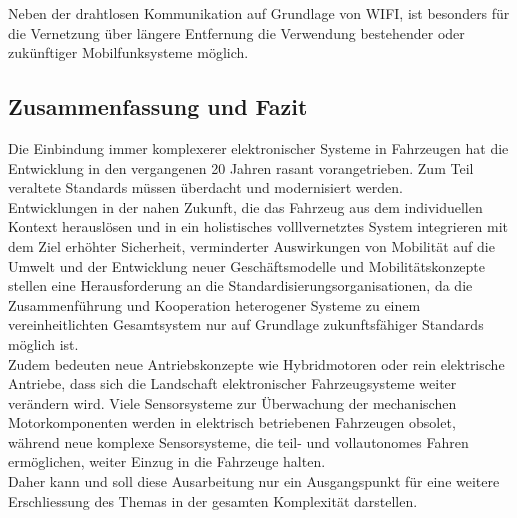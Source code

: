     Neben der drahtlosen Kommunikation auf Grundlage von WIFI, ist besonders für die Vernetzung über längere Entfernung die Verwendung bestehender oder zukünftiger Mobilfunksysteme möglich. 

   
    \subsection{Zusammenfassung und Fazit}
    Die Einbindung immer komplexerer elektronischer Systeme in Fahrzeugen hat die Entwicklung in den vergangenen
    20 Jahren rasant vorangetrieben. Zum Teil veraltete Standards müssen überdacht und modernisiert werden.\\
    Entwicklungen in der nahen Zukunft, die das Fahrzeug aus dem individuellen Kontext herauslösen und in ein holistisches volllvernetztes
    System integrieren mit dem Ziel erhöhter Sicherheit, verminderter Auswirkungen von Mobilität auf die Umwelt und der Entwicklung neuer Geschäftsmodelle
    und Mobilitätskonzepte stellen eine Herausforderung an die Standardisierungsorganisationen, da die Zusammenführung und Kooperation heterogener Systeme zu einem
    vereinheitlichten Gesamtsystem nur auf Grundlage zukunftsfähiger Standards möglich ist.\\
    
    Zudem bedeuten neue Antriebskonzepte wie Hybridmotoren oder rein elektrische Antriebe, dass sich die Landschaft elektronischer Fahrzeugsysteme
    weiter verändern wird. Viele Sensorsysteme zur Überwachung der mechanischen Motorkomponenten werden in elektrisch betriebenen Fahrzeugen obsolet, während
    neue komplexe Sensorsysteme, die teil- und vollautonomes Fahren ermöglichen, weiter Einzug in die Fahrzeuge halten.\\

    Daher kann und soll diese Ausarbeitung nur ein Ausgangspunkt für eine weitere Erschliessung des Themas in der gesamten Komplexität darstellen.
